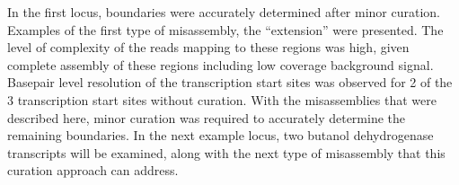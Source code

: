 In the first locus, boundaries were accurately determined after minor curation. Examples of the first type of misassembly, the ``extension'' were presented. The level of complexity of the reads mapping to these regions was high, given complete assembly of these regions including low coverage background signal. Basepair level resolution of the transcription start sites was observed for 2 of the 3 transcription start sites without curation. With the misassemblies that were described here, minor curation was required to accurately determine the remaining boundaries. In the next example locus, two butanol dehydrogenase transcripts will be examined, along with the next type of misassembly that this curation approach can address.


\begin{figure}


\end{figure}
